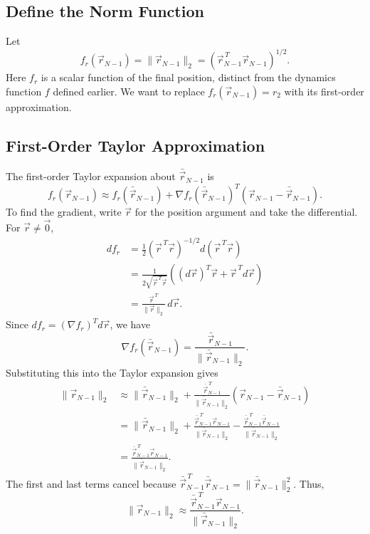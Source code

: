 \documentclass{article}
\begin{document}
\subsection{Define the Norm Function}

Let
\[
f_r(\vec{r}_{N-1})=\|\vec{r}_{N-1}\|_2
=\left(\vec{r}_{N-1}^{\,T}\vec{r}_{N-1}\right)^{1/2}.
\]
Here $f_r$ is a scalar function of the final position, distinct from the dynamics function $f$ defined earlier. We want to replace $f_r(\vec{r}_{N-1})=r_2$ with its first-order approximation.

\subsection{First-Order Taylor Approximation}

The first-order Taylor expansion about $\bar{\vec{r}}_{N-1}$ is
\[
f_r(\vec{r}_{N-1})\approx f_r(\bar{\vec{r}}_{N-1})
+\nabla f_r(\bar{\vec{r}}_{N-1})^T
\left(\vec{r}_{N-1}-\bar{\vec{r}}_{N-1}\right).
\]
To find the gradient, write $\vec{r}$ for the position argument and take the differential. For $\vec{r}\ne\vec{0}$,
\begin{align*}
 df_r
 &=\frac{1}{2}\left(\vec{r}^{\,T}\vec{r}\right)^{-1/2}
 d\left(\vec{r}^{\,T}\vec{r}\right)\\
 &=\frac{1}{2\sqrt{\vec{r}^{\,T}\vec{r}}}
 \left((d\vec{r})^T\vec{r}+\vec{r}^{\,T}d\vec{r}\right)\\
 &=\frac{\vec{r}^{\,T}}{\|\vec{r}\|_2}\,d\vec{r}.
\end{align*}
Since $df_r=(\nabla f_r)^T d\vec{r}$, we have
\[
\nabla f_r(\bar{\vec{r}}_{N-1})
=\frac{\bar{\vec{r}}_{N-1}}{\|\bar{\vec{r}}_{N-1}\|_2}.
\]
Substituting this into the Taylor expansion gives
\begin{align*}
\|\vec{r}_{N-1}\|_2
&\approx\|\bar{\vec{r}}_{N-1}\|_2
+\frac{\bar{\vec{r}}_{N-1}^{\,T}}{\|\bar{\vec{r}}_{N-1}\|_2}
\left(\vec{r}_{N-1}-\bar{\vec{r}}_{N-1}\right)\\
&=\|\bar{\vec{r}}_{N-1}\|_2
+\frac{\bar{\vec{r}}_{N-1}^{\,T}\vec{r}_{N-1}}{\|\bar{\vec{r}}_{N-1}\|_2}
-\frac{\bar{\vec{r}}_{N-1}^{\,T}\bar{\vec{r}}_{N-1}}{\|\bar{\vec{r}}_{N-1}\|_2}\\
&=\frac{\bar{\vec{r}}_{N-1}^{\,T}\vec{r}_{N-1}}{\|\bar{\vec{r}}_{N-1}\|_2}.
\end{align*}
The first and last terms cancel because $\bar{\vec{r}}_{N-1}^{\,T}\bar{\vec{r}}_{N-1}=\|\bar{\vec{r}}_{N-1}\|_2^2$. Thus,
\[
\boxed{\|\vec{r}_{N-1}\|_2\approx
\frac{\bar{\vec{r}}_{N-1}^{\,T}\vec{r}_{N-1}}{\|\bar{\vec{r}}_{N-1}\|_2}.}
\]
\end{document}
